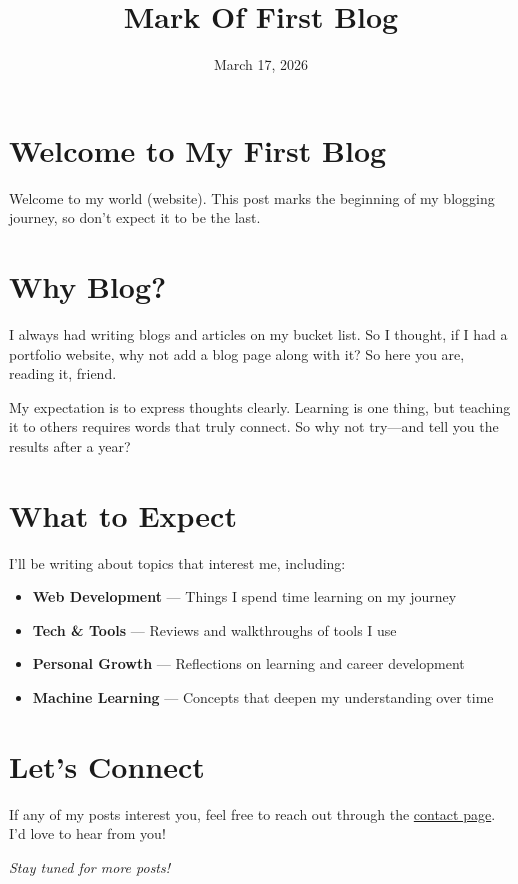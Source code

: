 \documentclass[12pt]{article}
\title{Mark Of First Blog}
\date{March 17, 2026}
\begin{document}
\maketitle

\section*{Welcome to My First Blog}

Welcome to my world (website). This post marks the beginning of my blogging journey, so don't expect it to be the last.

\vspace{1em}

\section*{Why Blog?}

I always had writing blogs and articles on my bucket list. So I thought, if I had a portfolio website, why not add a blog page along with it? So here you are, reading it, friend.

My expectation is to express thoughts clearly. Learning is one thing, but teaching it to others requires words that truly connect. So why not try---and tell you the results after a year?

\vspace{1em}

\section*{What to Expect}

I'll be writing about topics that interest me, including:

\begin{itemize}
    \item \textbf{Web Development} --- Things I spend time learning on my journey
    \item \textbf{Tech \& Tools} --- Reviews and walkthroughs of tools I use
    \item \textbf{Personal Growth} --- Reflections on learning and career development
    \item \textbf{Machine Learning} --- Concepts that deepen my understanding over time
\end{itemize}

\vspace{1em}

\section*{Let's Connect}

If any of my posts interest you, feel free to reach out through the \href{http://localhost/contact}{contact page}. I'd love to hear from you!

\vspace{2em}

\begin{center}
\textit{Stay tuned for more posts!}
\end{center}
\end{document}
